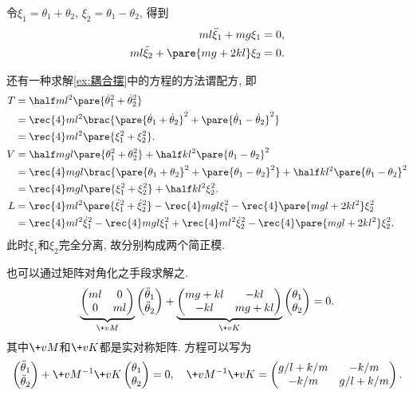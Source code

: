 \documentclass{ctexart}
\begin{document}
令$\xi_1 = \theta_1 + \theta_2$, $\xi_2 = \theta_1 - \theta_2$, 得到
\begin{align*}
    ml\ddot{\xi}_1 + mg\xi_1 &= 0, \\
    ml\ddot{\xi}_2 + \pare{mg+2kl} \xi_2 &= 0.
\end{align*}
\par
还有一种求解\cref{ex:耦合摆}中的方程的方法谓配方, 即
\begin{align*}
    T &= \half ml^2 \pare{\dot{\theta}_1^2 + \dot{\theta}_2^2} \\
    &= \rec{4} ml^2\brac{\pare{\dot{\theta}_1+\dot{\theta}_2}^2 + \pare{\dot{\theta}_1 - \dot{\theta}_2}^2} \\
    &= \rec{4} ml^2\pare{\xi_1^2 + \xi_2^2}. \\
    V &= \half mgl\pare{\theta_1^2 + \theta_2^2} + \half kl^2 \pare{\theta_1 - \theta_2}^2 \\
    &= \rec{4} mgl\brac{\pare{\theta_1 + \theta_2}^2 + \pare{\theta_1 - \theta_2}^2} + \half kl^2 \pare{\theta_1 - \theta_2}^2 \\
    &= \rec{4} mgl\pare{\xi_1^2 + \xi_2^2} + \half kl^2 \xi_2^2. \\
    L &= \rec{4}ml^2\pare{\dot{\xi}_1^2 + \dot{\xi}_2^2} - \rec{4}mgl\xi_1^2 - \rec{4}\pare{mgl+2kl^2}\xi_2^2 \\
    &= \rec{4}ml^2 \dot{\xi}_1^2 - \rec{4}mgl\xi_1^2 + \rec{4}ml^2\dot{\xi}_2^2 - \rec{4}\pare{mgl + 2kl^2}\xi_2^2.
\end{align*}
此时$\xi_1$和$\xi_2$完全分离, 故分别构成两个简正模.
\par
也可以通过矩阵对角化之手段求解之.
\[ \underbrace{\begin{pmatrix}
    ml & 0 \\ 0 & ml
\end{pmatrix}}_{\+vM}\begin{pmatrix}
    \ddot{\theta}_1 \\ \ddot{\theta}_2
\end{pmatrix} + \underbrace{\begin{pmatrix}
    mg+kl & -kl \\ -kl & mg+kl
\end{pmatrix}}_{\+vK}\begin{pmatrix}
    \theta_1 \\ \theta_2
\end{pmatrix} = 0. \]
其中$\+vM$和$\+vK$都是实对称矩阵. 方程可以写为
\[ \begin{pmatrix}
    \ddot{\theta}_1 \\ \ddot{\theta}_2
\end{pmatrix} + \+vM^{-1}\+vK \begin{pmatrix}
    \theta_1 \\ \theta_2
\end{pmatrix} = 0,\quad \+vM^{-1}\+vK = \begin{pmatrix}
    g/l + k/m & -k/m \\
    -k/m & g/l + k/m
\end{pmatrix}. \]
\end{document}
